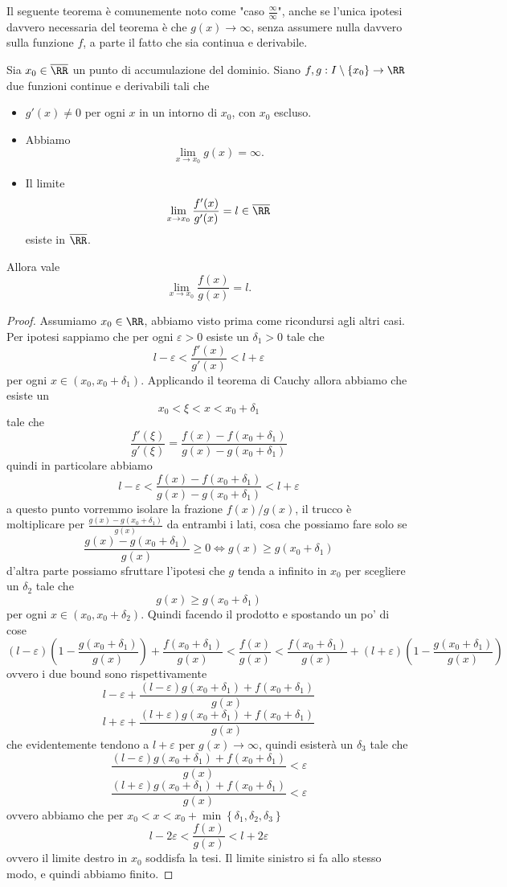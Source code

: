 \documentclass[11pt]{scrartcl}
\begin{document}
	Il seguente teorema è comunemente noto come "caso $\frac{\infty}{\infty}$", anche se l'unica ipotesi davvero necessaria del teorema è che $g(x)\to \infty$, senza assumere nulla davvero sulla funzione $f$, a parte il fatto che sia continua e derivabile.  
	\begin{theorem}
		Sia $x_0\in\overline{\RR}$ un punto di accumulazione del dominio. Siano $f,g:I\setminus\left\{x_0\right\}\to\RR$ due funzioni continue e derivabili tali che 
		\begin{itemize}
		\item $g'(x)\ne 0$ per ogni $x$ in un intorno di $x_0$, con $x_0$ escluso.
		\item Abbiamo
		$$\lim_{x\to x_0}g(x)=\infty.$$
		\item Il limite 
		$$\lim_{x\to x_0}\frac{f'(x)}{g'(x)}=l\in\overline{\RR}$$
		esiste in $\overline{\RR}$.
		\end{itemize}
		Allora vale
		$$\lim_{x\to x_0}\frac{f(x)}{g(x)}=l.$$
	\end{theorem}
	\begin{proof}
		Assumiamo $x_0\in\RR$, abbiamo visto prima come ricondursi agli altri casi. Per ipotesi sappiamo che per ogni $\varepsilon>0$ esiste un $\delta_1>0$ tale che 
		$$l-\varepsilon<\frac{f'(x)}{g'(x)}<l+\varepsilon$$
		per ogni $x\in (x_0,x_0+\delta_1)$. Applicando il teorema di Cauchy allora abbiamo che esiste un 
		$$x_0<\xi<x<x_0+\delta_1$$
		tale che
		$$\frac{f'(\xi)}{g'(\xi)}=\frac{f(x)-f(x_0+\delta_1)}{g(x)-g(x_0+\delta_1)}$$
		quindi in particolare abbiamo
		$$l-\varepsilon<\frac{f(x)-f(x_0+\delta_1)}{g(x)-g(x_0+\delta_1)}<l+\varepsilon$$
		a questo punto vorremmo isolare la frazione $f(x)/g(x)$, il trucco è moltiplicare per $\frac{g(x)-g(x_0+\delta_1)}{g(x)}$ da entrambi i lati, cosa che possiamo fare solo se 
		$$\frac{g(x)-g(x_0+\delta_1)}{g(x)}\ge 0 \iff g(x)\ge g(x_0+\delta_1)$$
		d'altra parte possiamo sfruttare l'ipotesi che $g$ tenda a infinito in $x_0$ per scegliere un $\delta_2$ tale che 
		$$g(x)\ge g(x_0+\delta_1)$$
		per ogni $x\in (x_0,x_0+\delta_2)$. Quindi facendo il prodotto e spostando un po' di cose
		$$(l-\varepsilon)\left(1-\frac{g(x_0+\delta_1)}{g(x)}\right)+\frac{f(x_0+\delta_1)}{g(x)}<\frac{f(x)}{g(x)}<\frac{f(x_0+\delta_1)}{g(x)}+(l+\varepsilon)\left(1-\frac{g(x_0+\delta_1)}{g(x)}\right)$$
		ovvero i due bound sono rispettivamente
		$$l-\varepsilon+\frac{(l-\varepsilon)g(x_0+\delta_1)+f(x_0+\delta_1)}{g(x)}$$
		$$l+\varepsilon+\frac{(l+\varepsilon)g(x_0+\delta_1)+f(x_0+\delta_1)}{g(x)}$$
		che evidentemente tendono a $l+\varepsilon$ per $g(x)\to \infty$, quindi esisterà un $\delta_3$ tale che
		$$\frac{(l-\varepsilon)g(x_0+\delta_1)+f(x_0+\delta_1)}{g(x)}<\varepsilon$$
		$$\frac{(l+\varepsilon)g(x_0+\delta_1)+f(x_0+\delta_1)}{g(x)}<\varepsilon$$
		ovvero abbiamo che per $x_0<x<x_0+\min\left\{\delta_1,\delta_2,\delta_3\right\}$ 
		$$l-2\varepsilon<\frac{f(x)}{g(x)}<l+2\varepsilon$$
		ovvero il limite destro in $x_0$ soddisfa la tesi. Il limite sinistro si fa allo stesso modo, e quindi abbiamo finito.
	\end{proof}
	
\end{document}
